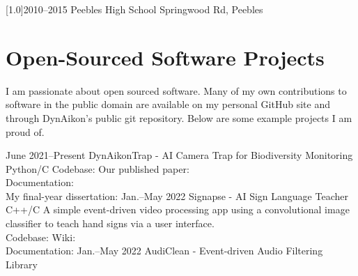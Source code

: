 \documentclass[a4paper]{cv-style}     %
\begin{document}
\begin{minipage}[b]{1.4\textwidth}
\begin{entrylist}
\entry
{\scalebox{.8}[1.0]{2010--2015}}
{Peebles High School}
{Springwood Rd, Peebles}

\end{entrylist}
\end{minipage}

\hspace*{-5.5cm}\begin{minipage}[b]{1.4\textwidth}
\vspace{-0.4cm}
\section{Open-Sourced Software Projects}
  \vspace{0.1cm}
I am passionate about open sourced software. Many of my own contributions to software in the public domain are available on my personal GitHub site and through DynAikon's public git repository. Below are some example projects I am proud of.
\vspace{0.1cm}
\begin{entrylist}
\entry
{June 2021--Present}
{DynAikonTrap - AI Camera Trap for Biodiversity Monitoring}
{Python/C}
{
Codebase:  Our published paper: \\
Documentation:  \\My final-year dissertation: 
}
\vspace{0.1cm}
\entry
{Jan.--May 2022}
{Signapse - AI Sign Language Teacher}
{C++/C}
{
A simple event-driven video processing app using a convolutional image classifier to teach hand signs via a user interface. \\
Codebase:  Wiki:  \\
Documentation: 
}
\vspace{0.1cm}
\entry
{Jan.--May 2022}
{AudiClean - Event-driven Audio Filtering Library}

\end{entrylist}
\end{minipage}
\end{document}
